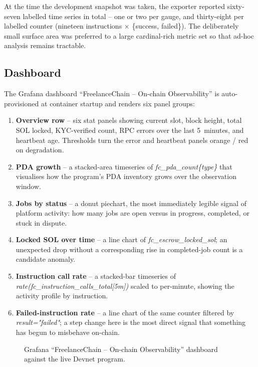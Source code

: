 \noindent At the time the development snapshot was taken, the exporter reported sixty-seven labelled time series in total -- one or two per gauge, and thirty-eight per labelled counter (nineteen instructions $\times$ \{success, failed\}). The deliberately small surface area was preferred to a large cardinal-rich metric set so that ad-hoc analysis remains tractable.

\subsection{Dashboard}
\label{subsection:4.7.4}

The Grafana dashboard ``FreelanceChain -- On-chain Observability'' is auto-provisioned at container startup and renders six panel groups:

\begin{enumerate}[noitemsep]
    \item \textbf{Overview row} -- six stat panels showing current slot, block height, total SOL locked, KYC-verified count, RPC errors over the last 5~minutes, and heartbeat age. Thresholds turn the error and heartbeat panels orange / red on degradation.
    \item \textbf{PDA growth} -- a stacked-area timeseries of \emph{fc\_pda\_count\{type\}} that visualises how the program's PDA inventory grows over the observation window.
    \item \textbf{Jobs by status} -- a donut piechart, the most immediately legible signal of platform activity: how many jobs are open versus in progress, completed, or stuck in dispute.
    \item \textbf{Locked SOL over time} -- a line chart of \emph{fc\_escrow\_locked\_sol}; an unexpected drop without a corresponding rise in completed-job count is a candidate anomaly.
    \item \textbf{Instruction call rate} -- a stacked-bar timeseries of \emph{rate(fc\_instruction\_calls\_total[5m])} scaled to per-minute, showing the activity profile by instruction.
    \item \textbf{Failed-instruction rate} -- a line chart of the same counter filtered by \emph{result="failed"}; a step change here is the most direct signal that something has begun to misbehave on-chain.
\end{enumerate}

\begin{figure}[H]
    \centering
    \caption{Grafana ``FreelanceChain -- On-chain Observability'' dashboard against the live Devnet program.}
    \label{fig:grafana_dashboard}
\end{figure}

